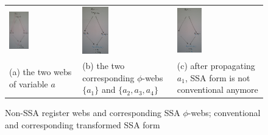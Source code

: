 \begin{figure}
\begin{tabular}{p{}p{}p{}}
\includegraphics[width=0.3\textwidth]{conventional-a.pdf} &
\includegraphics[width=0.3\textwidth]{conventional-b.pdf} &
\includegraphics[width=0.3\textwidth]{conventional-c.pdf} \\
(a) the two webs of variable $a$ & 
(b) the two corresponding $\phi$-webs $\{a_1\}$ and $\{a_2,a_3,a_4\}$ &
(c) after propagating $a_1$, SSA form is not conventional anymore
\end{tabular}
\caption{\label{fig:properties_and_flavors:conventional}Non-SSA register webs and corresponding SSA $\phi$-webs; conventional and corresponding transformed SSA form}
\end{figure}



